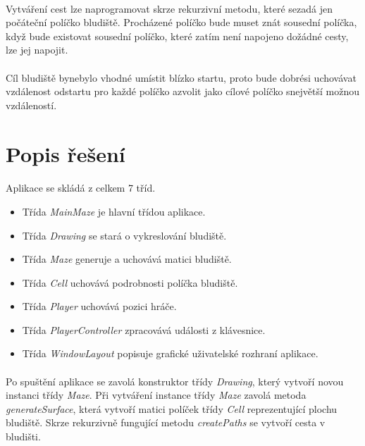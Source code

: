 \documentclass[12pt]{scrartcl}
\begin{document}
\paragraph{}
Vytváření cest lze naprogramovat skrze rekurzivní metodu, které se\nobreakspace zadá jen počáteční políčko bludiště. Procházené políčko bude muset znát sousední políčka, když bude existovat sousední políčko, které zatím není napojeno do\nobreakspace žádné cesty, lze jej napojit.
\paragraph{}
Cíl bludiště by\nobreakspace nebylo vhodné umístit blízko startu, proto bude dobré\nobreakspace si uchovávat vzdálenost od\nobreakspace startu pro každé políčko a\nobreakspace zvolit jako cílové políčko s\nobreakspace největší možnou vzdáleností.

\newpage
\section{Popis řešení}

\paragraph{}
Aplikace se skládá z celkem 7 tříd.
\begin{itemize}[noitemsep] 
\item Třída \emph{MainMaze} je hlavní třídou aplikace.
\item Třída \emph{Drawing} se stará o vykreslování bludiště.
\item Třída \emph{Maze} generuje a uchovává matici bludiště.
\item Třída \emph{Cell} uchovává podrobnosti políčka bludiště.
\item Třída \emph{Player} uchovává pozici hráče.
\item Třída \emph{PlayerController} zpracovává události z klávesnice.
\item Třída \emph{WindowLayout} popisuje grafické uživatelské rozhraní aplikace.
\end{itemize}

\paragraph{}
Po spuštění aplikace se zavolá konstruktor třídy \emph{Drawing}, který vytvoří novou instanci třídy \emph{Maze}. Při vytváření instance třídy \emph{Maze} zavolá metoda \emph{generateSurface}, která vytvoří matici políček třídy \emph{Cell} reprezentující plochu bludiště. Skrze rekurzivně fungující metodu \emph{createPaths} se vytvoří cesta v bludišti. 
\end{document}
